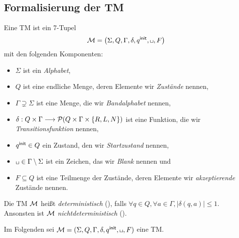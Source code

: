 \subsection{Formalisierung der \ac{TM}} %
\begin{Def}[name={[\acs*{TM}]}]\label{def:4.tm} %
	Eine \ac{TM} ist ein 7-Tupel
	\begin{equation*}
		\M=\left(\Sigma,Q,\Gamma,\delta,\qinit,\blank,F\right)
	\end{equation*}
	mit den folgenden Komponenten:
	\begin{itemize}
		\item $\Sigma$ ist ein \emph{Alphabet},
		\item $Q$ ist eine endliche Menge, deren Elemente wir \emph{Zustände} nennen,
		\item $\Gamma\supsetneq\Sigma$ ist eine Menge, die wir \emph{Bandalphabet} nennen,
		\item $\delta: Q\times\Gamma\--> \Powerset(Q\times\Gamma\times\{R,L,N\})$ ist eine Funktion, die wir \emph{Transitionsfunktion} nennen,
		\item $q^\mathsf{init}\in Q$ ein Zustand, den wir \emph{Startzustand} nennen,
		\item $\blank\in\Gamma\setminus\Sigma$ ist ein Zeichen, das wir \emph{Blank} nennen und
		\item $F\subseteq Q$ ist eine Teilmenge der Zustände, deren Elemente wir \emph{akzeptierende} Zustände nennen.
	\end{itemize}
        Die TM $\mathcal{M}$ heißt \emph{deterministisch}
        (), falls $\forall q\in Q, \forall a\in\Gamma, |\delta
        (q,a)| \le 1$.
        Ansonsten ist $\mathcal{M}$ \emph{nichtdeterministisch} ().
\end{Def}
Im Folgenden sei $\M=(\Sigma, Q, \Gamma, \delta, \qinit, \blank, F)$ eine \ac{TM}.


